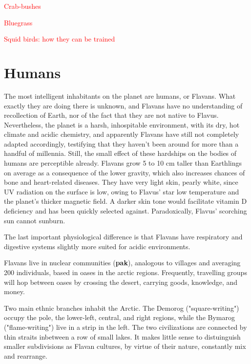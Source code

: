 \documentclass[10pt,oneside]{memoir}
\newcommand{\cmmnt}[1]{\textcolor{red}{#1}}
\begin{document}
\cmmnt{Crab-bushes}

\cmmnt{Bluegrass}

\cmmnt{Squid birds: how they can be trained}


\pagebreak

\section{Humans}

The most intelligent inhabitants on the planet are humans, or Flavans. What exactly they are doing there is unknown, and Flavans have no understanding of recollection of Earth, nor of the fact that they are not native to Flavus. Nevertheless, the planet is a harsh, inhospitable environment, with its dry, hot climate and acidic chemistry, and apparently Flavans have still not completely adapted accordingly, testifying that they haven't been around for more than a handful of millennia. Still, the small effect of these hardships on the bodies of humans are perceptible already. Flavans grow 5 to 10 cm taller than Earthlings on average as a consequence of the lower gravity, which also increases chances of bone and heart-related diseases. They have very light skin, pearly white, since UV radiation on the surface is low, owing to Flavus' star low temperature and the planet's thicker magnetic field. A darker skin tone would facilitate vitamin D deficiency and has been quickly selected against. Paradoxically, Flavus' scorching sun cannot sunburn.

The last important physiological difference is that Flavans have respiratory and digestive systems slightly more suited for acidic environments. 

Flavans live in nuclear communities (\textbf{pak}), analogous to villages and averaging 200 individuals, based in oases in the arctic regions. Frequently, travelling groups will hop between oases by crossing the desert, carrying goods, knowledge, and money.

Two main ethnic branches inhabit the Arctic. The Demorog ("square-writing") occupy the pole, the lower-left, central, and right regions, while the Bymarog ("flame-writing") live in a strip in the left. The two civilizations are connected by thin straits inbetween a row of small lakes. It makes little sense to distuinguish smaller subdivisions as Flavan cultures, by virtue of their nature, constantly mix and rearrange.
\end{document}
